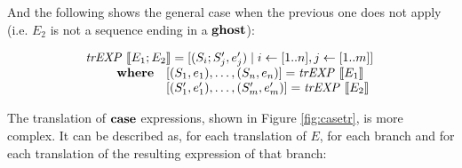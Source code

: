And the following shows the general case when the previous one does not apply
(i.e.  $E_2$ is not a sequence ending in a $\textbf{ghost}$):

\[
\begin{array}{l}
\mathit{trEXP}~\llbracket E_1;E_2\rrbracket = [(S_i;S_j',e'_j) \mid i \leftarrow [1..n], j \leftarrow [1..m]] \\
\qquad 
\begin{array}{ll}
\textbf{where} & [(S_1,e_1),\dots,(S_n, e_n)] = \mathit{trEXP}~\llbracket E_1\rrbracket \\
& [(S_1',e'_1),\dots,(S_m', e'_m)] = \mathit{trEXP}~\llbracket E_2\rrbracket \\
\end{array}
\end{array}
\]

The translation of $\textbf{case}$ expressions, shown in Figure \ref{fig:casetr}, is
more complex. It can be described as, for each translation of $E$, for each
branch and for each translation of the resulting expression of that branch:

